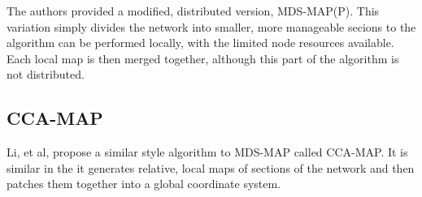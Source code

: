 The authors provided a modified, distributed version, MDS-MAP(P)\cite{MDS-MAP-P}.  This variation simply divides the network into smaller, more manageable secions to the algorithm can be performed locally, with the limited node resources available.  Each local map is then merged together, although this part of the algorithm is not distributed.

\subsection{CCA-MAP} \label{sec:CCA-MAP}
Li, et al, propose a similar style algorithm to MDS-MAP called CCA-MAP\cite{CCA-MAP07,CCA-MAP09}.  It is similar in the it generates relative, local maps of sections of the network and then patches them together into a global coordinate system.  
